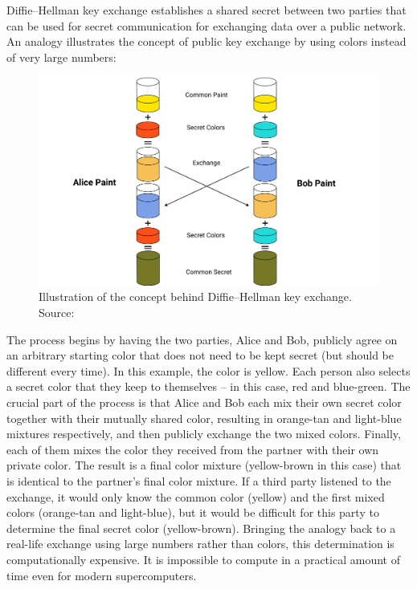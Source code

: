 Diffie–Hellman key exchange establishes a shared secret between two parties that can be used for secret communication
for exchanging data over a public network.
An analogy illustrates the concept of public key exchange by using colors instead of very large numbers:
\begin{figure}[H]
    \centering
    \includegraphics[width=1\textwidth]{Pictures/Diffie-Hellman.pdf}
    \caption{Illustration of the concept behind Diffie–Hellman key exchange. Source: }\label{fig:figure4}
\end{figure}
The process begins by having the two parties, Alice and Bob, publicly agree on an arbitrary starting color that does
not need to be kept secret (but should be different every time).
In this example, the color is yellow.
Each person also selects a secret color that they keep to themselves – in this case, red and blue-green.
The crucial part of the process is that Alice and Bob each mix their own secret color together with their mutually
shared color, resulting in orange-tan and light-blue mixtures respectively, and then publicly exchange the two mixed colors.
Finally, each of them mixes the color they received from the partner with their own private color.
The result is a final color mixture (yellow-brown in this case) that is identical to the partner's final color mixture.
If a third party listened to the exchange, it would only know the common color (yellow) and the first mixed colors
(orange-tan and light-blue), but it would be difficult for this party to determine the final secret color (yellow-brown).
Bringing the analogy back to a real-life exchange using large numbers rather than colors, this determination is
computationally expensive.
It is impossible to compute in a practical amount of time even for modern supercomputers.

